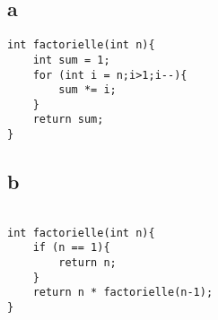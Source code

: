 \documentclass{article}
\begin{document}
\subsection*{a}

\begin{lstlisting}
int factorielle(int n){
    int sum = 1;
    for (int i = n;i>1;i--){
        sum *= i;
    }
    return sum;
}
\end{lstlisting}

\subsection*{b}

\begin{lstlisting}

int factorielle(int n){
    if (n == 1){
        return n;
    }
    return n * factorielle(n-1);
}
\end{lstlisting}
\end{document}
